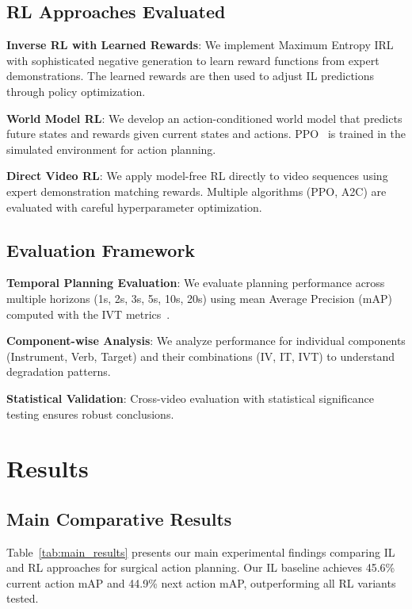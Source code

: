 \documentclass[runningheads]{llncs}
\begin{document}
\subsection{RL Approaches Evaluated}

\textbf{Inverse RL with Learned Rewards}: We implement Maximum Entropy IRL~\cite{ziebart2008maximum} with sophisticated negative generation to learn reward functions from expert demonstrations. The learned rewards are then used to adjust IL predictions through policy optimization.

\textbf{World Model RL}: We develop an action-conditioned world model that predicts future states and rewards given current states and actions. PPO~\cite{schulman2017proximal} is trained in the simulated environment for action planning.

\textbf{Direct Video RL}: We apply model-free RL directly to video sequences using expert demonstration matching rewards. Multiple algorithms (PPO, A2C) are evaluated with careful hyperparameter optimization.

\subsection{Evaluation Framework}

\textbf{Temporal Planning Evaluation}: We evaluate planning performance across multiple horizons (1s, 2s, 3s, 5s, 10s, 20s) using mean Average Precision (mAP) computed with the IVT metrics~\cite{nwoye2022cholect50}.

\textbf{Component-wise Analysis}: We analyze performance for individual components (Instrument, Verb, Target) and their combinations (IV, IT, IVT) to understand degradation patterns.

\textbf{Statistical Validation}: Cross-video evaluation with statistical significance testing ensures robust conclusions.


\section{Results}

\subsection{Main Comparative Results}

Table~\ref{tab:main_results} presents our main experimental findings comparing IL and RL approaches for surgical action planning. Our IL baseline achieves 45.6\% current action mAP and 44.9\% next action mAP, outperforming all RL variants tested.
\end{document}

